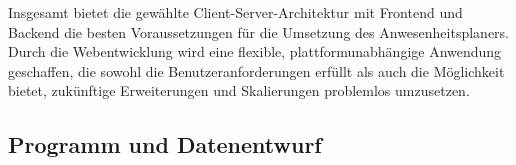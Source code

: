 Insgesamt bietet die gewählte Client-Server-Architektur mit Frontend und Backend die besten Voraussetzungen für die Umsetzung des Anwesenheitsplaners. Durch die Webentwicklung wird eine flexible, plattformunabhängige Anwendung geschaffen, die sowohl die Benutzeranforderungen erfüllt als auch die Möglichkeit bietet, zukünftige Erweiterungen und Skalierungen problemlos umzusetzen.


\subsection{Programm und Datenentwurf}
\label{sec:ProgrammUDatenentwurf}